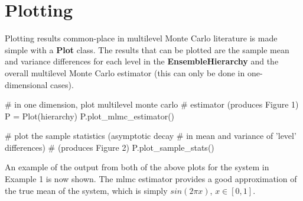 \documentclass[10pt,letterpaper,extrafontsizes]{memoir}
\newcommand\pythonclass[1]{\textbf{\color{deepred}#1}}
\begin{document}
\chapter{Plotting}

Plotting results common-place in multilevel Monte Carlo literature is made simple with a \pythonclass{Plot} class. The results that can be plotted are the sample mean and variance differences for each level in the \pythonclass{EnsembleHierarchy} and the overall multilevel Monte Carlo estimator (this can only be done in one-dimensional cases). \\

\begin{python}
# in one dimension, plot multilevel monte carlo
# estimator (produces Figure 1)
P = Plot(hierarchy)
P.plot_mlmc_estimator()
\end{python}

\begin{python}
# plot the sample statistics (asymptotic decay
# in mean and variance of 'level' differences)
# (produces Figure 2)
P.plot_sample_stats()
\end{python}

An example of the output from both of the above plots for the system in Example 1 is now shown. The mlmc estimator provides a good approximation of the true mean of the system, which is simply $sin(2\pi x)$, $x \in [0, 1]$. 
\end{document}
